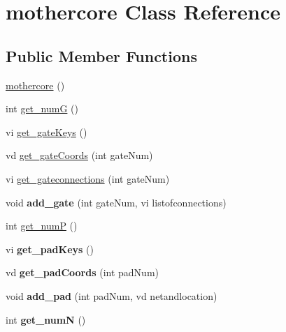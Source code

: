 \hypertarget{classmothercore}{}\section{mothercore Class Reference}
\label{classmothercore}
\subsection*{Public Member Functions}
\begin{DoxyCompactItemize}
\item 
\hyperlink{classmothercore_a4e87f0b1793e8630542ecdeda85b6aff}{mothercore} ()
\item 
int \hyperlink{classmothercore_a09c4a400c467d3919410e60059ce6d6b}{get\+\_\+numG} ()
\item 
vi \hyperlink{classmothercore_a70c3317ac95e5633a546c559cab115af}{get\+\_\+gate\+Keys} ()
\item 
vd \hyperlink{classmothercore_ab6b8c312d6900e5d00e8e27dd71dd0a7}{get\+\_\+gate\+Coords} (int gate\+Num)
\item 
vi \hyperlink{classmothercore_a8aabd0cfa0d3847847479d38324cda08}{get\+\_\+gateconnections} (int gate\+Num)
\item 
void {\bfseries add\+\_\+gate} (int gate\+Num, vi listofconnections)\hypertarget{classmothercore_a63e5b0b6f6bc0da68773f8d5be644ad1}{}\label{classmothercore_a63e5b0b6f6bc0da68773f8d5be644ad1}

\item 
int \hyperlink{classmothercore_a7c2f3835bf93b1eb4362ed3c2a337059}{get\+\_\+numP} ()
\item 
vi {\bfseries get\+\_\+pad\+Keys} ()\hypertarget{classmothercore_a3c88ba5f96b7a085fd09ea7838b78b59}{}\label{classmothercore_a3c88ba5f96b7a085fd09ea7838b78b59}

\item 
vd {\bfseries get\+\_\+pad\+Coords} (int pad\+Num)\hypertarget{classmothercore_a0fee073bf0953a90161564224654b657}{}\label{classmothercore_a0fee073bf0953a90161564224654b657}

\item 
void {\bfseries add\+\_\+pad} (int pad\+Num, vd netandlocation)\hypertarget{classmothercore_a5582864a594c614cffce53cdf41f74c2}{}\label{classmothercore_a5582864a594c614cffce53cdf41f74c2}

\item 
int {\bfseries get\+\_\+numN} ()\hypertarget{classmothercore_ac704662ff0379b33e7a3a6c35b21fbe1}{}\label{classmothercore_ac704662ff0379b33e7a3a6c35b21fbe1}


\end{DoxyCompactItemize}
